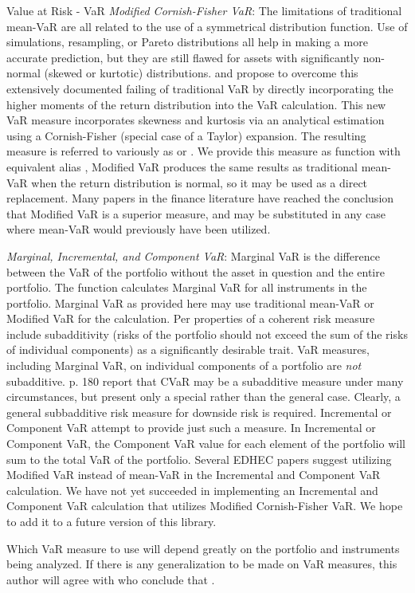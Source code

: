 \documentclass[12pt,letterpaper,english]{article}
\begin{document}
\begin{Section}{Value at Risk - VaR}
\emph{Modified Cornish-Fisher VaR}:
The limitations of traditional mean-VaR are all related to the use of a symmetrical distribution function.  Use of simulations, resampling, or Pareto distributions all help in making a more accurate prediction, but they are still flawed for assets with significantly non-normal (skewed or kurtotic) distributions. \Cite{Huisman(1999)} and \Cite{Favre and Galleano(2002)} propose to overcome this extensively documented failing of traditional VaR by directly incorporating the higher moments of the return distribution into the VaR calculation.  This new VaR measure incorporates skewness and kurtosis via an analytical estimation using a Cornish-Fisher (special case of a Taylor) expansion. The resulting measure is referred to variously as  or .  We provide this measure as function  with equivalent alias , Modified VaR produces the same results as traditional mean-VaR when the return distribution is normal, so it may be used as a direct replacement.  Many papers in the finance literature have reached the conclusion that Modified VaR is a superior measure, and may be substituted in any case where mean-VaR would previously have been utilized.

\emph{Marginal, Incremental, and Component VaR}:
Marginal VaR is the difference between the VaR of the portfolio without the asset in question and the entire portfolio.  The  function calculates Marginal VaR for all instruments in the portfolio. Marginal VaR as provided here may use traditional mean-VaR or Modified VaR for the calculation. Per \Cite{Artzner,et.al.(1997)} properties of a coherent risk measure include subadditivity (risks of the portfolio should not exceed the sum of the risks of individual components) as a significantly desirable trait.  VaR measures, including Marginal VaR, on individual components of a portfolio are \emph{not} subadditive.  \Cite{Sherer and Martin(2005)} p. 180 report that CVaR may be a subadditive measure under many circumstances, but present only a special rather than the general case.  Clearly, a general subbadditive risk measure for downside risk is required.  Incremental or Component VaR attempt to provide just such a measure.  In Incremental or Component VaR, the Component VaR value for each element of the portfolio will sum to the total VaR of the portfolio.  Several EDHEC papers suggest utilizing Modified VaR instead of mean-VaR in the Incremental and Component VaR calculation.  We have not yet succeeded in implementing an Incremental and Component VaR calculation that utilizes Modified Cornish-Fisher VaR.  We hope to add it to a future version of this library.

Which VaR measure to use will depend greatly on the portfolio and instruments being analyzed.  If there is any generalization to be made on VaR measures, this author will agree with \Cite{Bali and Gokcan(2004)} who conclude that .
\end{Section}
\end{document}

